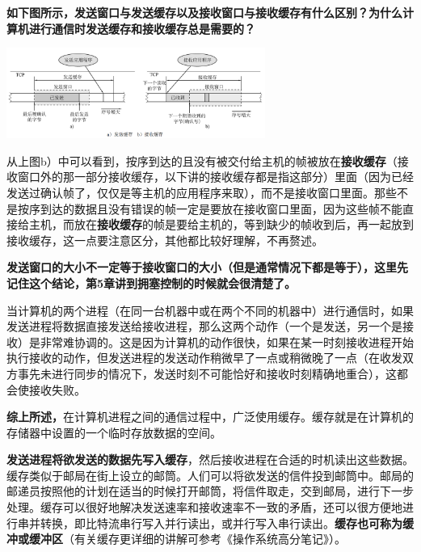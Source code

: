 \textbf{如下图所示，发送窗口与发送缓存以及接收窗口与接收缓存有什么区别？为什么计算机进行通信时发送缓存和接收缓存总是需要的？}

\textbf{\includegraphics[width=3.33333in,height=1.16667in]{png-jpeg-pics/47491CE31EE01CEECE0A88EF4E528713.png}\\
}

从上图b）中可以看到，按序到达的且没有被交付给主机的帧被放在\textbf{接收缓存}（接收窗口外的那一部分接收缓存，以下讲的接收缓存都是指这部分）里面（因为已经发送过确认帧了，仅仅是等主机的应用程序来取），而不是接收窗口里面。那些不是按序到达的数据且没有错误的帧一定是要放在接收窗口里面，因为这些帧不能直接给主机，而放在\textbf{接收缓存}的帧是要给主机的，等到缺少的帧收到后，再一起放到接收缓存，这一点要注意区分，其他都比较好理解，不再赘述。

\textbf{发送窗口的大小不一定等于接收窗口的大小（但是通常情况下都是等于），这里先记住这个结论，第5章讲到拥塞控制的时候就会很清楚了。}

当计算机的两个进程（在同一台机器中或在两个不同的机器中）进行通信时，如果发送进程将数据直接发送给接收进程，那么这两个动作（一个是发送，另一个是接收）是非常难协调的。这是因为计算机的动作很快，如果在某一时刻接收进程开始执行接收的动作，但发送进程的发送动作稍微早了一点或稍微晚了一点（在收发双方事先未进行同步的情况下，发送时刻不可能恰好和接收时刻精确地重合），这都会使接收失败。

\textbf{综上所述，}在计算机进程之间的通信过程中，广泛使用{缓存}。缓存就是在计算机的存储器中设置的一个临时存放数据的空间。

\textbf{发送进程将欲发送的数据先写入缓存}，然后接收进程在合适的时机读出这些数据。{缓存}类似于邮局在街上设立的邮筒。人们可以将欲发送的信件投到邮筒中。邮局的邮递员按照他的计划在适当的时候打开邮筒，将信件取走，交到邮局，进行下一步处理。缓存可以很好地解决发送速率和接收速率不一致的矛盾，还可以很方便地进行串并转换，即比特流串行写入并行读出，或并行写入串行读出。\textbf{缓存也可称为缓冲或缓冲区}（有关缓存更详细的讲解可参考《操作系统高分笔记》）。

